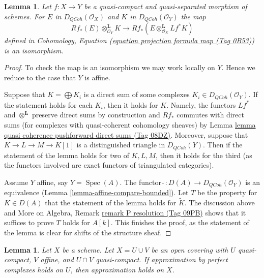 \documentclass{amsart}
\theoremstyle{plain}
\newtheorem{lemma}[subsection]{Lemma}
\theoremstyle{definition}
\theoremstyle{remark}
\numberwithin{equation}{subsection}
\def\Spec{\mathop{\mathrm{Spec}}}
\def\QCoh{\mathit{QCoh}}
\begin{document}
\begin{lemma}
\label{lemma-cohomology-base-change}
Let $f : X \to Y$ be a quasi-compact and quasi-separated morphism
of schemes. For $E$ in $D_\QCoh(\mathcal{O}_X)$ and
$K$ in $D_\QCoh(\mathcal{O}_Y)$ the map
$$
Rf_*(E) \otimes_{\mathcal{O}_Y}^\mathbf{L} K
\longrightarrow
Rf_*(E \otimes_{\mathcal{O}_X}^\mathbf{L} Lf^*K)
$$
defined in
Cohomology, Equation (\href{https://stacks.math.columbia.edu/tag/0B53}{equation projection formula map (Tag 0B53)})
is an isomorphism.
\end{lemma}

\begin{proof}
To check the map is an isomorphism we may work locally on $Y$.
Hence we reduce to the case that $Y$ is affine.

\medskip\noindent
Suppose that $K = \bigoplus K_i$ is a direct
sum of some complexes $K_i \in D_\QCoh(\mathcal{O}_Y)$.
If the statement holds for each $K_i$, then it holds for $K$.
Namely, the functors $Lf^*$ and $\otimes^\mathbf{L}$ preserve
direct sums by construction and $Rf_*$ commutes with direct sums
(for complexes with quasi-coherent cohomology sheaves) by
Lemma \href{https://stacks.math.columbia.edu/tag/08DZ}{lemma quasi coherence pushforward direct sums (Tag 08DZ)}.
Moreover, suppose that $K \to L \to M \to K[1]$ is a distinguished
triangle in $D_\QCoh(Y)$. Then if the statement of the
lemma holds for two of $K, L, M$, then it holds for the third
(as the functors involved are exact functors of triangulated categories).

\medskip\noindent
Assume $Y$ affine, say $Y = \Spec(A)$. The functor
$\widetilde{\ } : D(A) \to D_\QCoh(\mathcal{O}_Y)$ is an equivalence
(Lemma \ref{lemma-affine-compare-bounded}).
Let $T$ be the property for $K \in D(A)$ that
the statement of the lemma holds for $\widetilde{K}$.
The discussion above and
More on Algebra, Remark \href{https://stacks.math.columbia.edu/tag/09PB}{remark P resolution (Tag 09PB)}
shows that it suffices to prove $T$ holds for $A[k]$.
This finishes the proof, as the statement of the lemma
is clear for shifts of the structure sheaf.
\end{proof}


\begin{lemma}
\label{lemma-induction-step}
Let $X$ be a scheme. Let $X = U \cup V$ be an open covering
with $U$ quasi-compact, $V$ affine, and $U \cap V$ quasi-compact.
If approximation by perfect complexes holds on $U$,
then approximation holds on $X$.
\end{lemma}
\end{document}
